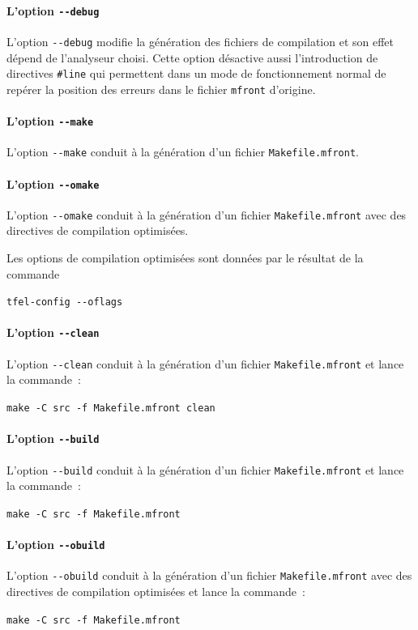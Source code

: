 \documentclass[rectoverso,pleiades,pstricks,leqno,anti]{texmf/note_technique_2010}
\newcommand{\mfront}{\texttt{mfront}}
\newcommand{\moption}[1]{\texttt{-{}-#1}}
\begin{document}
\paragraph{L'option \moption{debug}} L'option \moption{debug} modifie la
génération des fichiers de compilation et son effet dépend de
l'analyseur choisi. Cette option désactive aussi l'introduction de
directives \texttt{\#line} qui permettent dans un mode de fonctionnement
normal de repérer la position des erreurs dans le fichier \mfront{}
d'origine.

\paragraph{L'option \moption{make}} L'option \moption{make} conduit à la
génération d'un fichier {\tt Makefile.mfront}.

\paragraph{L'option \moption{omake}} L'option \moption{omake} conduit à la
génération d'un fichier {\tt Makefile.mfront} avec des directives de
compilation optimisées.

Les options de compilation optimisées sont données par le résultat de la
commande~
\begin{center}
  {\tt tfel-config -{}-oflags}
\end{center}

\paragraph{L'option \moption{clean}} L'option \moption{clean} conduit à la
génération d'un fichier {\tt Makefile.mfront} et lance la commande~:
\begin{center}
  {\tt make -C src -f Makefile.mfront clean}
\end{center}

\paragraph{L'option \moption{build}} L'option \moption{build} conduit à la
génération d'un fichier {\tt Makefile.mfront} et lance la commande~:
\begin{center}
  {\tt make -C src -f Makefile.mfront}
\end{center}

\paragraph{L'option \moption{obuild}} L'option \moption{obuild} conduit à la
génération d'un fichier {\tt Makefile.mfront} avec des directives de
compilation optimisées et lance la commande~:
\begin{center}
  {\tt make -C src -f Makefile.mfront}
\end{center}
\end{document}
